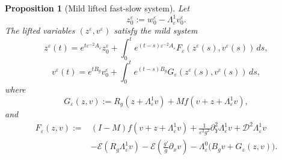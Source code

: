 \documentclass[11pt]{article}
\newtheorem{proposition}[theorem]{Proposition}
\theoremstyle{definition}
\theoremstyle{remark}
\numberwithin{equation}{section}
\begin{document}
\begin{proposition}[Mild lifted fast-slow system]
\label{prop:mild-lifted-fast-slow-system}
Let
\[
z_0^\varepsilon:=w_0^\varepsilon-\Lambda_\varepsilon^1v_0^\varepsilon.
\]
The lifted variables \((z^\varepsilon,v^\varepsilon)\) satisfy the mild system
\[
z^\varepsilon(t)
=
e^{t\varepsilon^{-2}A_\varepsilon}z_0^\varepsilon
+
\int_0^t
e^{(t-s)\varepsilon^{-2}A_\varepsilon}
F_\varepsilon(z^\varepsilon(s),v^\varepsilon(s))\,ds,
\]
\[
v^\varepsilon(t)
=
e^{tB_g}v_0^\varepsilon
+
\int_0^t
e^{(t-s)B_g}
G_\varepsilon(z^\varepsilon(s),v^\varepsilon(s))\,ds,
\]
where
\[
G_\varepsilon(z,v)
:=
R_g(z+\Lambda_\varepsilon^1v)
+
Mf(v+z+\Lambda_\varepsilon^1v),
\]
and
\begin{align*}
F_\varepsilon(z,v)
:={}&
(I-M)f(v+z+\Lambda_\varepsilon^1v)
+
\frac1{\varepsilon^2g^2}\partial_Y^2\Lambda_\varepsilon^1v
+
\mathcal D^2\Lambda_\varepsilon^1v
\\
&-
\mathcal E(R_g\Lambda_\varepsilon^1v)
-
\mathcal E\!\left(\frac{g'}g\partial_xv\right)
-
\Lambda_\varepsilon^0
\bigl(B_gv+G_\varepsilon(z,v)\bigr).
\end{align*}
\end{proposition}
\end{document}
